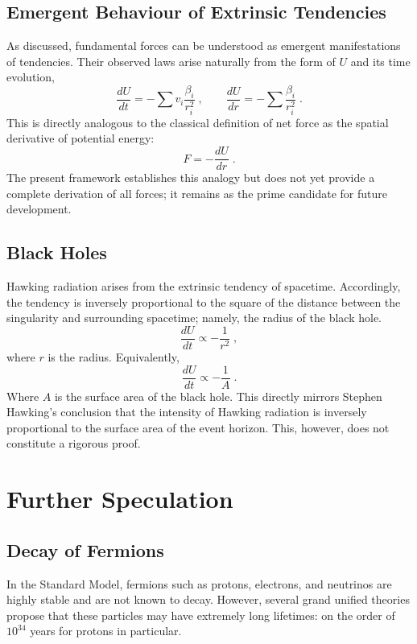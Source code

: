 \documentclass{article}
\begin{document}
\subsection{Emergent Behaviour of Extrinsic Tendencies}

As discussed, fundamental forces can be understood as emergent manifestations of tendencies.
Their observed laws arise naturally from the form of $U$ and its time evolution,
\[
    \frac{dU}{dt} = -\sum v_{i}\frac{\beta_{i}}{r_{i}^2}\;,
    \qquad
    \frac{dU}{dr} = -\sum \frac{\beta_{i}}{r_{i}^2}\;.
\]
This is directly analogous to the classical definition of net force as the spatial derivative of potential energy:
\[
    F = -\frac{dU}{dr}\;.
\]
The present framework establishes this analogy but does not yet provide a complete derivation of all forces; it remains as the prime candidate for future development.


\subsection{Black Holes}

Hawking radiation arises from the extrinsic tendency of spacetime. 
Accordingly, the tendency is inversely proportional to the square of the distance between the singularity and surrounding spacetime; namely, the radius of the black hole.
\[
    \frac{dU}{dt} \propto -\frac{1}{r^2}\;,
\]
where $r$ is the radius. Equivalently,
\[
    \frac{dU}{dt} \propto -\frac{1}{A}\;.
\]
Where $A$ is the surface area of the black hole. 
This directly mirrors Stephen Hawking's conclusion that the intensity of Hawking radiation is inversely proportional to the surface area of the event horizon. This, however, does not constitute a rigorous proof.



\newpage
\section{Further Speculation}


\subsection{Decay of Fermions}

In the Standard Model, fermions such as protons, electrons, and neutrinos are highly stable and are not known to decay. 
However, several grand unified theories propose that these particles may have extremely long lifetimes: on the order of $10^{34}$ years for protons in particular.
 
\end{document}
